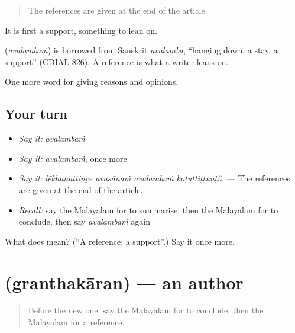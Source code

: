 \begin{quote}
The references are given at the end of the article.
\end{quote}

It is first a support, something to lean on.

\begin{cousinweb}
\textbf{} (\emph{avalambaṁ}) is borrowed from Sanskrit \emph{avalamba}, \textquotedblleft{}hanging down; a stay, a support\textquotedblright{} (CDIAL 826). A reference is what a writer leans on.
\end{cousinweb}

\begin{grammarlens}[title={What you've built}]
One more word for giving reasons and opinions.
\end{grammarlens}

\subsection*{Your turn}
\begin{itemize}
\raggedright
  \item \emph{Say it:} \emph{avalambaṁ}
  \item \emph{Say it:} \emph{avalambaṁ}, once more
  \item \emph{Say it:} \emph{lēkhanattinṟe avasānaṁ avalambaṁ koṭuttiṭṭuṇṭŭ.} — The references are given at the end of the article.
  \item \emph{Recall:} say the Malayalam for to summarise, then the Malayalam for to conclude, then say \emph{avalambaṁ} again
\end{itemize}

\begin{tcolorbox}[breakable,colback=teal!4,colframe=teal!35!black,title={Before you move on}]
What does  mean? (\textquotedblleft{}A reference; a support\textquotedblright{}.) Say it once more.
\end{tcolorbox}
\section[\texorpdfstring{\ml{ഗ്രന്ഥകാരൻ} (granthakāran)}{ഗ്രന്ഥകാരൻ (granthakāran)}]{ (granthakāran) — an author}

\label{lesson:ML-C439-granthakaran}



\begin{quote}
Before the new one: say the Malayalam for to conclude, then the Malayalam for a reference.
\end{quote}


